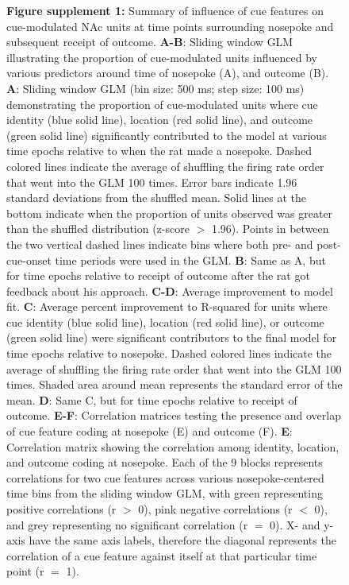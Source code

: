 \documentclass[11pt]{article}
\newcommand{\bsf}[1]{\textbf{#1}}
\begin{document}
\begin{figure}[ht!]
\caption*{\bsf{Figure supplement 1:} Summary of influence of cue features on cue-modulated NAc units at time points surrounding nosepoke and subsequent receipt of outcome. \bsf{A-B}: Sliding window GLM illustrating the proportion of cue-modulated units influenced by various predictors around time of nosepoke (A), and outcome (B). \bsf{A}: Sliding window GLM (bin size: 500 ms; step size: 100 ms) demonstrating the proportion of cue-modulated units where cue identity (blue solid line), location (red solid line), and outcome (green solid line) significantly contributed to the model at various time epochs relative to when the rat made a nosepoke. Dashed colored lines indicate the average of shuffling the firing rate order that went into the GLM 100 times. Error bars indicate 1.96 standard deviations from the shuffled mean. Solid lines at the bottom indicate when the proportion of units observed was greater than the shuffled distribution (z-score $>$ 1.96). Points in between the two vertical dashed lines indicate bins where both pre- and post-cue-onset time periods were used in the GLM. \bsf{B}: Same as A, but for time epochs relative to receipt of outcome after the rat got feedback about his approach. \bsf{C-D}: Average improvement to model fit. \bsf{C}: Average percent improvement to R-squared for units where cue identity (blue solid line), location (red solid line), or outcome (green solid line) were significant contributors to the final model for time epochs relative to nosepoke. Dashed colored lines indicate the average of shuffling the firing rate order that went into the GLM 100 times. Shaded area around mean represents the standard error of the mean. \bsf{D}: Same C, but for time epochs relative to receipt of outcome. \bsf{E-F}: Correlation matrices testing the presence and overlap of cue feature coding at nosepoke (E) and outcome (F). \bsf{E}: Correlation matrix showing the correlation among identity, location, and outcome coding at nosepoke. Each of the 9 blocks represents correlations for two cue features across various nosepoke-centered time bins from the sliding window GLM, with green representing positive correlations (r $>$ 0), pink negative correlations (r $<$ 0), and grey representing no significant correlation (r $=$ 0). X- and y-axis have the same axis labels, therefore the diagonal represents the correlation of a cue feature against itself at that particular time point (r $=$ 1).}
\label{fig:Q2SUPP1}
\end{figure} \clearpage
\end{document}
